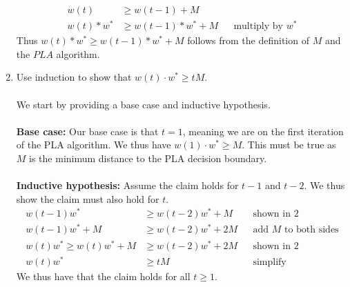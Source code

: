 \documentclass{article}
\begin{document}
\begin{enumerate}
	\begin{align}
	w(t) &\geq w(t-1) + M && \\
	w(t) * w^* &\geq w(t-1)*w^* + M && \text{multiply by } w^*
	\end{align}
	Thus $w(t) * w^* \geq w(t-1)*w^* + M$ follows from the definition of $M$ and the $PLA$ algorithm.
	\item Use induction to show that $w(t) \cdot w^* \geq tM$.
	\\\\ We start by providing a base case and inductive hypothesis.
	\\\\ \textbf{Base case:} Our base case is that $t=1$, meaning we are on the first iteration of the PLA algorithm. We thus have $w(1)\cdot w^* \geq M$. This must be true as $M$ is the minimum distance to the PLA decision boundary.
	\\\\ \textbf{Inductive hypothesis:} Assume the claim holds for $t-1$ and $t-2$. We thus show the claim must also hold for $t$.
	\begin{align}
	w(t-1)w^* &\geq w(t-2)w^* + M && \text{shown in } 2 \\
    w(t-1)w^* + M & \geq w(t-2)w^* + 2M && \text{add $M$ to both sides} \\
    w(t)w^* \geq w(t)w^* + M &\geq w(t-2)w^* + 2M && \text{shown in } 2\\
    w(t)w^* &\geq tM && \text{simplify}
	\end{align}
	We thus have that the claim holds for all $t\geq 1$.
\end{enumerate}
	
\end{document}

